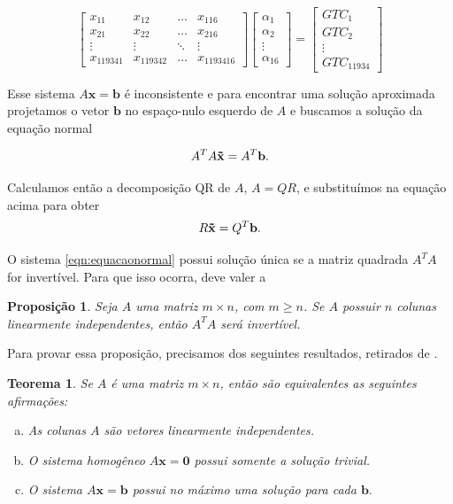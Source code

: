 \documentclass[a4paper, 12pt]{article}
\newtheorem{teorema}{Teorema}
\newtheorem{proposicao}{Proposição}
\theoremstyle{definition}
\theoremstyle{remark}
\begin{document}
$$
\begin{bmatrix}
    x_{11} & x_{12} & \dots & x_{116} \\
    x_{21} & x_{22} & \dots & x_{216} \\
    \vdots & \vdots & \ddots & \vdots \\
    x_{119341} & x_{119342} & \dots & x_{1193416}
\end{bmatrix}
\begin{bmatrix}
    \alpha_1 \\
    \alpha_2 \\
    \vdots\\
    \alpha_{16}
\end{bmatrix}
=
\begin{bmatrix}
    GTC_1 \\
    GTC_2 \\
    \vdots\\
    GTC_{11934}
\end{bmatrix}
$$

Esse sistema $A\mathbf{x} = \mathbf{b}$ é inconsistente e para encontrar uma solução aproximada projetamos o vetor $\mathbf{b}$ no espaço-nulo esquerdo de $A$ e buscamos a solução da equação normal 

\begin{equation}
\label{eqn:equacaonormal}
    A^TA\mathbf{\Tilde{x}} = A^T\mathbf{b}.
\end{equation}


Calculamos então a decomposição QR de $A$, $A = QR$, e substituímos na equação acima para obter $$R\mathbf{\Tilde{x}} = Q^T\mathbf{b}.$$

O sistema \ref{eqn:equacaonormal} possui solução única se a matriz quadrada $A^TA$ for invertível. Para que isso ocorra, deve valer a

\begin{proposicao}
\label{matrizli}
Seja $A$ uma matriz $m \times n$, com $m \geq n$. Se $A$ possuir $n$ colunas linearmente independentes, então $A^TA$ será invertível.
\end{proposicao}

Para provar essa proposição, precisamos dos seguintes resultados, retirados de \cite{algebra-linear-teoria-e-aplicacoes}.

\begin{teorema}
\label{colunasli}
Se $A$ é uma matriz $m \times n$, então são equivalentes as seguintes afirmações:

\begin{enumerate}[a.]
    \item As colunas $A$ são vetores linearmente independentes.
    \item O sistema homogêneo $A\mathbf{x} = \mathbf{0}$ possui somente a solução trivial.
    \item O sistema $A\mathbf{x} = \mathbf{b}$ possui no máximo uma solução para cada $\mathbf{b}.$
\end{enumerate}
\end{teorema}
\end{document}
